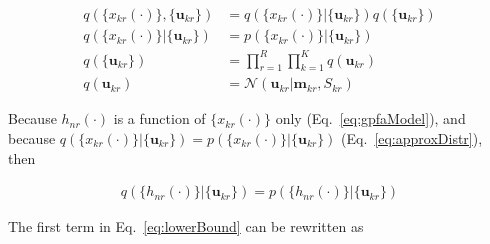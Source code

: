 \documentclass[12pt]{article}
\begin{document}
\begin{equation}
    \begin{aligned}
        q(\{x_{kr}(\cdot)\}, \{\mathbf{u}_{kr}\})&=q(\{x_{kr}(\cdot)\}|\{\mathbf{u}_{kr}\})q(\{\mathbf{u}_{kr}\})\\
        q(\{x_{kr}(\cdot)\}|\{\mathbf{u}_{kr}\})&=p(\{x_{kr}(\cdot)\}|\{\mathbf{u}_{kr}\})\\
        q(\{\mathbf{u}_{kr}\})&=\prod_{r=1}^R\prod_{k=1}^Kq(\mathbf{u}_{kr})\\
        q(\mathbf{u}_{kr})&=\mathcal{N}(\mathbf{u}_{kr}|\mathbf{m}_{kr},S_{kr})
    \end{aligned}
    \label{eq:approxDistr}
\end{equation}

Because $h_{nr}(\cdot)$ is a function of $\{x_{kr}(\cdot)\}$ only (Eq.~\ref{eq:gpfaModel}), and because $q(\{x_{kr}(\cdot)\}|\{\mathbf{u}_{kr}\})=p(\{x_{kr}(\cdot)\}|\{\mathbf{u}_{kr}\})$ (Eq.~\ref{eq:approxDistr}), then 

\begin{align}
    q(\{h_{nr}(\cdot)\}|\{\mathbf{u}_{kr}\})=p(\{h_{nr}(\cdot)\}|\{\mathbf{u}_{kr}\})
    \label{eq:qH_equals_pH}
\end{align}

The first term in Eq.~\ref{eq:lowerBound} can be rewritten as
\end{document}
